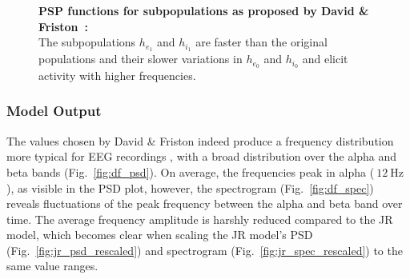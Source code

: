 \begin{figure}[H]
    \centering
    \pgfplotsset{compat = newest}

    \caption{\textbf{PSP functions for subpopulations as proposed by David \& Friston~\cite{david_neural_2003}:} \\
        The subpopulations $h_{e_1}$ and $h_{i_1}$ are faster
        than the original populations and their slower variations in $h_{e_0}$ and $h_{i_0}$ and
        elicit activity with higher frequencies.
    }
    \label{fig:PSPPlotDavidFriston}
\end{figure}

\subsubsection{Model Output}
The values chosen by David \& Friston indeed produce a frequency distribution more
typical for EEG recordings \citationneeded,
with a broad distribution over the alpha and beta bands (Fig.~\ref{fig:df_psd}).
On average, the frequencies peak in alpha ($~\SI{12}{\hertz}$), as visible in the PSD plot,
however, the spectrogram (Fig.~\ref{fig:df_spec}) reveals fluctuations of the peak frequency
between the alpha and beta band over time.
The average frequency amplitude is harshly reduced compared to the JR model,
which becomes clear when scaling the JR model's PSD (Fig.~\ref{fig:jr_psd_rescaled})
and spectrogram (Fig.~\ref{fig:jr_spec_rescaled}) to the same value ranges.

